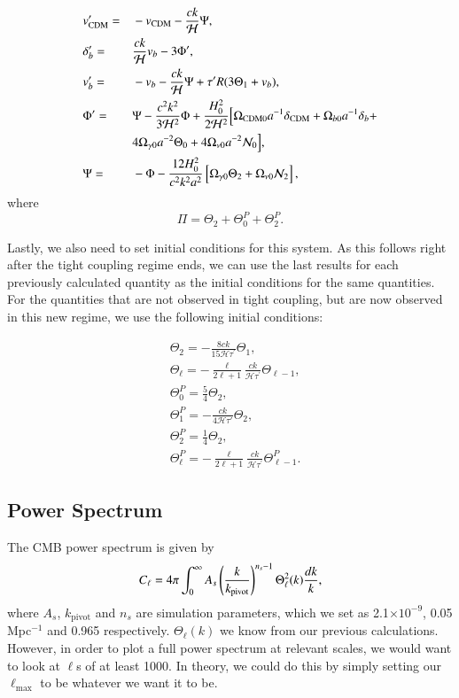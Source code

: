 \documentclass{aa}
\begin{document}
\begin{align*}
&v_{\rm CDM}^\prime =&& -v_{\rm CDM} -\frac{ck}{\mathcal{H}} \Psi, \\
&\delta_b^\prime =&& \frac{ck}{\mathcal{H}}v_b -3\Phi^\prime, \\
&v_b^\prime =&& -v_b - \frac{ck}{\mathcal{H}}\Psi + \tau^\prime R(3\Theta_1 + v_b), \\
&\Phi^\prime =&& \Psi - \frac{c^2k^2}{3\mathcal{H}^2} \Phi + \frac{H_0^2}{2\mathcal{H}^2}
\Bigl[\Omega_{\rm CDM 0} a^{-1} \delta_{\rm CDM} + \Omega_{b 0} a^{-1} \delta_b + \\& &&4\Omega_{\gamma 0}
a^{-2}\Theta_0 + 4\Omega_{\nu 0}a^{-2}\mathcal{N}_0\Bigr], \\
&\Psi =&& -\Phi - \frac{12H_0^2}{c^2k^2a^2}\left[\Omega_{\gamma 0}\Theta_2 + \Omega_{\nu 0}\mathcal{N}_2\right],
\end{align*}
where
\begin{equation}\label{eq:pi}
\Pi= \Theta_2 + \Theta_0^P + \Theta_2^P.
\end{equation}

Lastly, we also need to set initial conditions for this system. As this follows right after the tight coupling regime ends, we can use the last results for each previously calculated quantity as the initial conditions for the same quantities. For the quantities that are not observed in tight coupling, but are now observed in this new regime, we use the following initial conditions:

\begin{align*}
&\Theta_2 = -\frac{8ck}{15\mathcal{H}\tau^\prime} \Theta_1,\\
&\Theta_\ell = -\frac{\ell}{2\ell+1} \frac{ck}{\mathcal{H}\tau^\prime} \Theta_{\ell-1},\\
&\Theta_0^P = \frac{5}{4} \Theta_2, \\
&\Theta_1^P = -\frac{ck}{4\mathcal{H}\tau'} \Theta_2, \\
&\Theta_2^P = \frac{1}{4}\Theta_2, \\
&\Theta_\ell^P = -\frac{\ell}{2\ell+1} \frac{ck}{\mathcal{H}\tau^\prime} \Theta_{\ell-1}^P.
\end{align*}

\subsection{Power Spectrum}

The CMB power spectrum is given by
\begin{equation}  
C_\ell = 4\pi \int_0^{\infty} A_s \left(\frac{k}{k_{\rm pivot}}\right)^{n_s-1} \Theta_\ell^2(k) \frac{dk}{k},
\end{equation}
where $A_s$, $k_\text{pivot}$ and $n_s$ are simulation parameters, which we set as 2.1$\times10^{-9}$, 0.05 Mpc$^{-1}$ and 0.965 respectively. $\Theta_\ell(k)$ we know from our previous calculations. However, in order to plot a full power spectrum at relevant scales, we would want to look at $\ell$s of at least 1000. In theory, we could do this by simply setting our $\ell_\text{max}$ to be whatever we want it to be.
\end{document}
